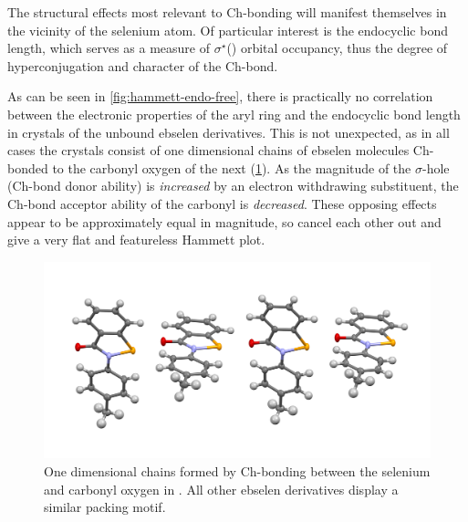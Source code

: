 \begin{refsection}
The structural effects most relevant to Ch-bonding will manifest themselves in the vicinity of the selenium atom.
Of particular interest is the endocyclic  bond length, which serves as a measure of $\sigma^\star$() orbital occupancy, thus the degree of hyperconjugation and character of the Ch-bond.

As can be seen in \cref{fig:hammett-endo-free}, there is practically no correlation between the electronic properties of the aryl ring and the endocyclic  bond length in crystals of the unbound ebselen derivatives.
This is not unexpected, as in all cases the crystals consist of one dimensional chains of ebselen molecules Ch-bonded to the carbonyl oxygen of the next (\cref{fig:ebs-me-packing}).
As the magnitude of the $ \sigma $-hole (Ch-bond donor ability) is \emph{increased} by an electron withdrawing substituent, the Ch-bond acceptor ability of the carbonyl is \emph{decreased}.
These opposing effects appear to be approximately equal in magnitude, so cancel each other out and give a very flat and featureless Hammett plot.

\begin{figure}
  \centering
  \includegraphics[width=0.6\linewidth]{Figures/ebs.me-packing.pdf}
  \caption[One dimensional chains formed by Ch-bonding between the selenium and carbonyl oxygen in .]{One dimensional chains formed by Ch-bonding between the selenium and carbonyl oxygen in . All other ebselen derivatives display a similar packing motif.}\label{fig:ebs-me-packing}
\end{figure}


\end{refsection}
